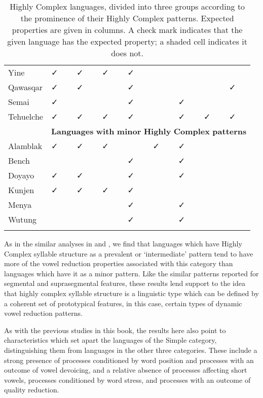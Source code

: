 \begin{table}
\begin{tabularx}{\textwidth}{XXXXXXXXX}
\hhline{~--------}
 Yine & ✓ & ✓ & ✓ & ✓ &  &  &  & \\
\hhline{~--------}
 Qawasqar & ✓ & ✓ &  & ✓ &  &  &  & ✓\\
\hhline{~--------}
 Semai & ✓ &  &  & ✓ &  & ✓ &  & \\
\hhline{~--------}
 Tehuelche & ✓ & ✓ & ✓ & ✓ &  & ✓ & ✓ & ✓\\
& \multicolumn{8}{c}{ \textbf{Languages} \textbf{with} \textbf{minor} \textbf{Highly} \textbf{Complex} \textbf{patterns}}\\
\hhline{~--------}
 Alamblak & ✓ & ✓ & ✓ &  & ✓ & ✓ &  & \\
\hhline{~--------}
 Bench &  &  &  & ✓ &  & ✓ &  & \\
\hhline{~--------}
 Doyayo & ✓ & ✓ &  & ✓ &  & ✓ &  & \\
\hhline{~--------}
 Kunjen & { ✓} & ✓ & ✓ & ✓ &  &  &  & \\
\hhline{~--------}
 Menya &  &  &  & ✓ &  & ✓ &  & \\
\hhline{~--------}
 Wutung &  &  &  & ✓ &  & ✓ &  & \\
\lspbottomrule
\end{tabularx}
\caption{\label{6.11}Highly Complex languages, divided into three groups according to the prominence of their Highly Complex patterns. Expected properties are given in columns. A check mark indicates that the given language has the expected property; a shaded cell indicates it does not.}
\end{table}




  As in the similar analyses in  and , we find that languages which have Highly Complex syllable structure as a prevalent or ‘intermediate’ pattern tend to have more of the vowel reduction properties associated with this category than languages which have it as a minor pattern. Like the similar patterns reported for segmental and suprasegmental features, these results lend support to the idea that highly complex syllable structure is a linguistic type which can be defined by a coherent set of prototypical features, in this case, certain types of dynamic vowel reduction patterns.



  As with the previous studies in this book, the results here also point to characteristics which set apart the languages of the Simple category, distinguishing them from languages in the other three categories. These include a strong presence of processes conditioned by word position and processes with an outcome of vowel devoicing, and a relative absence of processes affecting short vowels, processes conditioned by word stress, and processes with an outcome of quality reduction.



